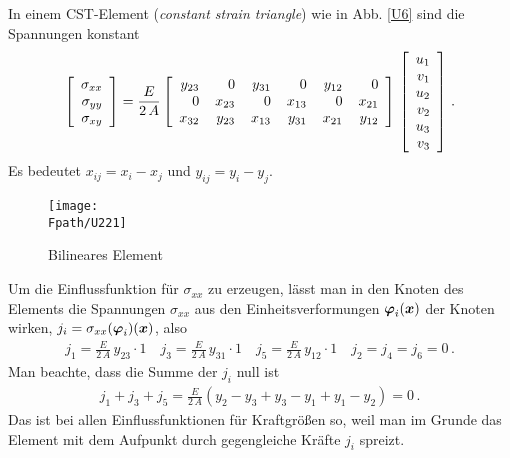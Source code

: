 \begin{example}
In einem CST-Element ({\em constant strain triangle\/}) wie in Abb. \ref{U6} sind die Spannungen konstant
\begin{align}
\left[\barr{r} \sigma_{xx} \\ \sigma_{yy} \\ \sigma_{xy}\earr \right]  = \frac{E}{2\,A} \left[ \barr {r @{\hspace{4mm}} r @{\hspace{4mm}} r
@{\hspace{4mm}} r  @{\hspace{4mm}} r @{\hspace{4mm}} r}
      y_{23} & 0 &y_{31} &0 & y_{12} & 0  \\
     0 & x_{23} & 0 &x_{13} &0 & x_{21}  \\
        x_{32} & y_{23} &x_{13} &y_{31} & x_{21} & y_{12}
    \earr \right]\,\left[\barr{r} u_1 \\ v_1  \\ u_2 \\ v_2 \\ u_3 \\ v_3\earr \right]\,.
\end{align}
Es bedeutet $x_{ij} = x_i - x_j$ und $y_{ij} = y_i - y_j$.
\begin{figure}[tbp]
\centering
\if {} \sidecaption[t] \fi
\texttt{[image: \\Fpath/U221]}
\caption{Bilineares Element}
\label{U221}
\end{figure}%

Um die Einflussfunktion f\"{u}r $\sigma_{xx}$ zu erzeugen, l\"{a}sst man in den Knoten des Elements die Spannungen $\sigma_{xx}$ aus den Einheitsverformungen $\mbox{\boldmath $\varphi$}_i(\mbox{\boldmath $x$})$ der Knoten wirken, $j_i = \sigma_{xx}(\mbox{\boldmath $\varphi$}_i)(\mbox{\boldmath $x$})$, also
\begin{align}
j_1 = \frac{E}{2\,A}\,y_{23} \cdot 1 \quad j_3 =  \frac{E}{2\,A}\,y_{31} \cdot 1 \quad j_5 =  \frac{E}{2\,A}\,y_{12} \cdot 1\quad j_2 = j_4 = j_6 = 0 \,.
\end{align}
Man beachte, dass die Summe der $j_i$ null ist
\begin{align}
j_1 + j_3 + j_5 =  \frac{E}{2\,A}( y_2 - y_3 + y_3 - y_1 + y_1 - y_2) = 0\,.
\end{align}
Das ist bei allen Einflussfunktionen f\"{u}r Kraftgr\"{o}{\ss}en so, weil man im Grunde das Element mit dem Aufpunkt durch gegengleiche Kr\"{a}fte $j_i$ spreizt.
\end{example}
